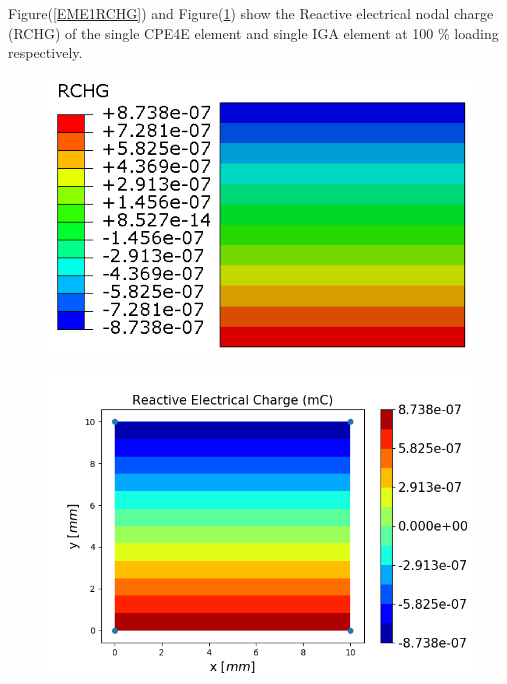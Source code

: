 \documentclass[12pt]{article}
\begin{document}
Figure(\ref{EME1RCHG}) and Figure(\ref{EME1RCHG_IGA}) show the Reactive electrical nodal charge (RCHG) of the single CPE4E element and single IGA element at 100 \% loading respectively. \\
\begin{figure}[H]
	\centering
	\begin{minipage}{.5\textwidth}
		\centering
		\includegraphics[width=1\linewidth]{EME1RCHG.png}
		\label{EME1RCHG}
	\end{minipage}%
	\begin{minipage}{.6\textwidth}
		\centering
		\includegraphics[width=1\linewidth]{EME1RCHG_IGA.png}
		\label{EME1RCHG_IGA}
	\end{minipage}
\end{figure}
\end{document}
